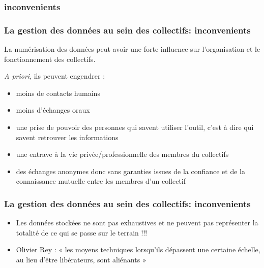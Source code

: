 \subsubsection{inconvenients}

\begin{frame}
\frametitle{La gestion des données au sein des collectifs: inconvenients}

La numérisation des données peut avoir une forte influence sur l'organisation et le fonctionnement des
collectifs.

\vfill

\textit{A priori}, ils peuvent engendrer  :
\begin{itemize}
\item moins de contacts humains
\item moins d'échanges oraux
\item une prise de pouvoir des personnes qui savent utiliser l'outil, c'est à dire qui savent retrouver les informations
\item une entrave à la vie privée/professionnelle des membres du collectifs
\item des échanges anonymes donc sans garanties issues de la confiance et de la connaissance mutuelle entre les membres d'un collectif
\end{itemize}

\end{frame}

\begin{frame}
\frametitle{La gestion des données au sein des collectifs: inconvenients}

\begin{itemize}
\item Les données stockées ne sont pas exhaustives et ne peuvent pas représenter la totalité de ce qui se passe sur le terrain !!!

\item Olivier Rey : « les moyens techniques lorsqu'ils dépassent une certaine échelle, au lieu d'être libérateurs, sont aliénants »
\end{itemize}


\end{frame}


